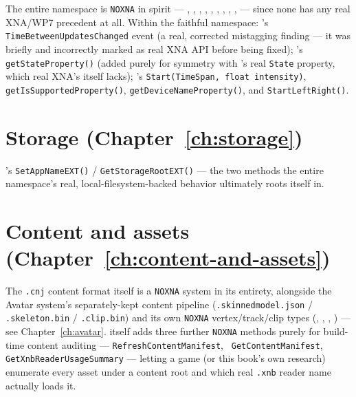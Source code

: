 The entire  namespace is \texttt{NOXNA} in spirit --- ,
, , , ,
, , , ,
 --- since none has any real XNA/WP7 precedent at all. Within the
faithful  namespace: 's
\texttt{TimeBetweenUpdatesChanged} event (a real, corrected mistagging finding --- it was
briefly and incorrectly marked as real XNA API before being fixed); 's
\texttt{getStateProperty()} (added purely for symmetry with 's real
\texttt{State} property, which real XNA's  itself lacks);
's \texttt{Start(TimeSpan, float intensity)},
\texttt{getIsSupportedProperty()}, \texttt{getDeviceNameProperty()}, and
\texttt{StartLeftRight()}.

\section{Storage (Chapter~\ref{ch:storage})}

's \texttt{SetAppNameEXT()} / \texttt{GetStorageRootEXT()} --- the two
methods the entire namespace's real, local-filesystem-backed behavior ultimately roots
itself in.

\section{Content and assets (Chapter~\ref{ch:content-and-assets})}

The \texttt{.cnj} content format itself is a \texttt{NOXNA} system in its entirety, alongside
the Avatar system's separately-kept  content pipeline
(\texttt{.skinnedmodel.json} / \texttt{.skeleton.bin} / \texttt{.clip.bin}) and its own
\texttt{NOXNA} vertex/track/clip types (,
, , ) --- see
Chapter~\ref{ch:avatar}.  itself adds three further \texttt{NOXNA} methods purely
for build-time content auditing --- \texttt{RefreshContentManifest}, \texttt{%
GetContentManifest}, \texttt{GetXnbReaderUsageSummary} --- letting a game (or this book's own
research) enumerate every asset under a content root and which real \texttt{.xnb} reader name
actually loads it.

